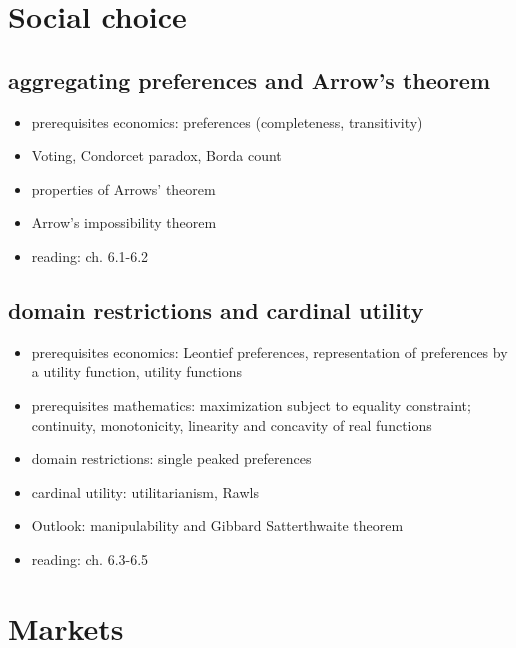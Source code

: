 \documentclass[11pt]{article}
\author{Christoph Schottmüller}
\date{\today}
\title{}
\begin{document}
\section{Social choice}
\label{sec:org7d99279}
\subsection{aggregating preferences and Arrow's theorem}
\label{sec:orgafdc4d3}
\begin{itemize}
\item prerequisites economics: preferences (completeness, transitivity)
\item Voting, Condorcet paradox, Borda count
\item properties of Arrows' theorem
\item Arrow's impossibility theorem
\item reading: \cite{jehle2001advanced} ch. 6.1-6.2
\end{itemize}

\subsection{domain restrictions and cardinal utility}
\label{sec:org2a8566c}
\begin{itemize}
\item prerequisites economics:  Leontief preferences, representation of preferences by a utility function, utility functions
\item prerequisites mathematics: maximization subject to equality constraint; continuity, monotonicity, linearity and concavity of real functions
\item domain restrictions: single peaked preferences
\item cardinal utility: utilitarianism, Rawls
\item Outlook: manipulability and Gibbard Satterthwaite theorem
\item reading: \cite{jehle2001advanced} ch. 6.3-6.5
\end{itemize}

\section{Markets}
\label{sec:org4cd4f47}
\end{document}
